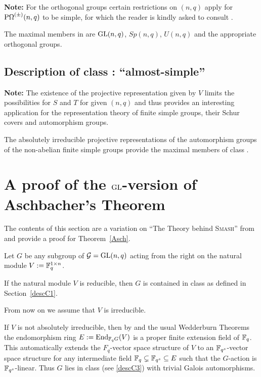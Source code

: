 \textbf{Note:} For the orthogonal groups certain restrictions on $(n,q)$
apply for $\POmega^{(\pm)}(n,q)$ to be simple, for which the reader is kindly
asked to consult \cite[Section~2.4]{ATLAS}.

\stru
The maximal members in  are $\GL(n,q)$, $Sp(n,q)$, $U(n,q)$ and the
appropriate orthogonal groups.

\subsection{Description of class : ``almost-simple''}
\label{descC9}


\textbf{Note:} The existence of the projective representation given by $V$
limits the possibilities for $S$ and $T$ for given $(n,q)$ and thus
provides an interesting application for the representation theory of finite
simple groups, their Schur covers and automorphism groups.

\medskip
\stru
The absolutely irreducible projective representations of the automorphism
groups of the non-abelian finite simple groups provide the maximal members
of class .


\section{A proof of the $\mathbf{\GL}$-version of Aschbacher's Theorem}
\label{AschProof}

The contents of this section are a variation on ``The Theory behind
\textsc{Smash}'' from \cite[Section~2]{smashnormal} and provide a proof for
Theorem~\ref{Asch}.

Let $G$ be any subgroup of $\GG = \GL(n,q)$ acting from the right on the
natural module $V := \mathbb{F}_q^{1 \times n}$.

If the natural module $V$ is reducible, then $G$ is contained in class 
as defined in Section~\ref{descC1}.

From now on we assume that $V$ is irreducible.

If $V$ is not absolutely irreducible, then by \cite[(29.13)]{CR0} and the 
usual Wedderburn Theorems
the endomorphism ring $E := \End_{\F_q G}(V)$ is a proper finite extension field
of $\mathbb{F}_q$. This automatically extends the $F_q$-vector space structure of
$V$ to an $\mathbb{F}_{q^s}$-vector space structure for any intermediate field 
$\mathbb{F}_q \subsetneq \mathbb{F}_{q^s} \subseteq E$ such that the $G$-action is
$\mathbb{F}_{q^s}$-linear. Thus $G$ lies in class  (see \ref{descC3})
with trivial Galois
automorphisms.

